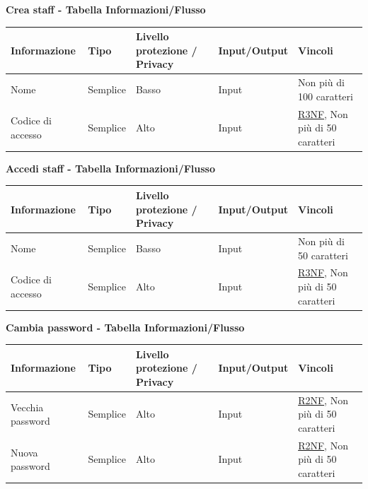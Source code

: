 \documentclass[a4paper]{article}
\begin{document}
\textbf{Crea staff  - Tabella Informazioni/Flusso}

\begin{center}
    \begin{tabularx}{1\textwidth}{|X|l|X|X|X|}
        \hline
        \textbf{Informazione} &\textbf{Tipo} & \textbf{Livello protezione / Privacy} & \textbf{Input/Output} & \textbf{Vincoli}\\
        \hline
        \hline
        Nome & Semplice & Basso & Input & Non più di 100 caratteri\\
        \hline
        Codice di accesso & Semplice & Alto & Input & \hyperlink{R3NF}{R3NF}, Non più di 50 caratteri\\
        \hline
    \end{tabularx}
\end{center}

\textbf{Accedi staff  - Tabella Informazioni/Flusso}

\begin{center}
    \begin{tabularx}{1\textwidth}{|X|l|X|X|X|}
        \hline
        \textbf{Informazione} &\textbf{Tipo} & \textbf{Livello protezione / Privacy} & \textbf{Input/Output} & \textbf{Vincoli}\\
        \hline
        \hline
        Nome & Semplice & Basso & Input & Non più di 50 caratteri\\
        \hline
        Codice di accesso & Semplice & Alto & Input & \hyperlink{R3NF}{R3NF}, Non più di 50 caratteri\\
        \hline
    \end{tabularx}
\end{center}

\textbf{Cambia password  - Tabella Informazioni/Flusso}

\begin{center}
    \begin{tabularx}{1\textwidth}{|X|l|X|X|X|}
        \hline
        \textbf{Informazione} &\textbf{Tipo} & \textbf{Livello protezione / Privacy} & \textbf{Input/Output} & \textbf{Vincoli}\\
        \hline
        \hline
        Vecchia password & Semplice & Alto & Input & \hyperlink{R2NF}{R2NF}, Non più di 50 caratteri\\
        \hline
        Nuova password & Semplice & Alto & Input & \hyperlink{R2NF}{R2NF}, Non più di 50 caratteri\\
        \hline
    \end{tabularx}
\end{center}
\end{document}
